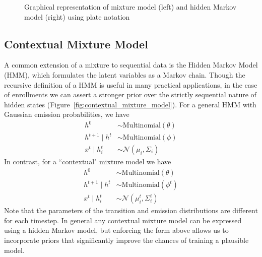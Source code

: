 \documentclass{edm_template}
\begin{document}
\begin{figure}
	\centering
	\caption{\label{fig:mixture_model} Graphical representation of mixture model (left) and hidden Markov model (right) using plate notation}
\end{figure}

\subsection{Contextual Mixture Model}

A common extension of a mixture to sequential data is the Hidden Markov Model (HMM), which formulates the latent variables as a Markov chain. Though the recursive definition of a HMM is useful in many practical applications, in the case of enrollments we can assert a stronger prior over the strictly sequential nature of hidden states (Figure~\ref{fig:contextual_mixture_model}). For a general HMM with Gaussian emission probabilities, we have 
\begin{align*}
h^0 &\sim \text{Multinomial}(\theta) \\    
h^{t+1} \mid h^{t} &\sim \text{Multinomial}(\phi) \\
x^{t} \mid h_i^{t} &\sim \mathcal{N}(\mu_i, \Sigma_i)
\end{align*}
In contrast, for a ``contextual" mixture model we have 
\begin{align*}
h^0 &\sim \text{Multinomial}(\theta) \\    
h^{t+1} \mid h^{t} &\sim \text{Multinomial}(\phi^t) \\
x^{t} \mid h_i^{t} &\sim \mathcal{N}(\mu^t_i, \Sigma^t_i)
\end{align*}
Note that the parameters of the transition and emission distributions are different for each timestep. In general any contextual mixture model can be expressed using a hidden Markov model, but enforcing the form above allows us to incorporate priors that significantly improve the chances of training a plausible model.
\end{document}

